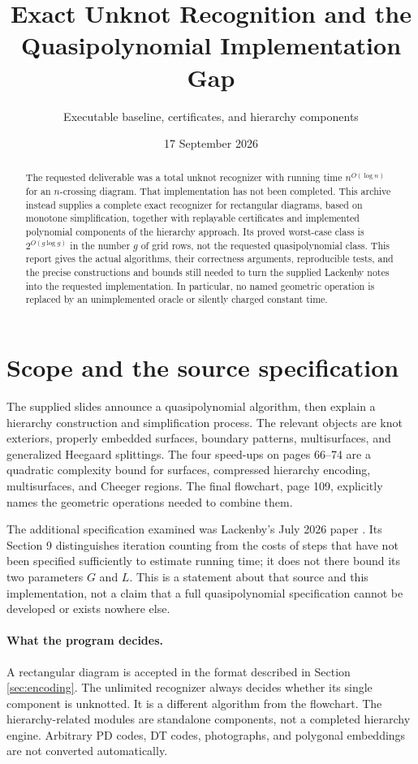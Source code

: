 \documentclass[11pt]{article}
\title{Exact Unknot Recognition and the\\Quasipolynomial Implementation Gap}
\author{Executable baseline, certificates, and hierarchy components}
\date{17 September 2026}
\begin{document}
\maketitle
\begin{abstract}
The requested deliverable was a total unknot recognizer with running time
$n^{O(\log n)}$ for an $n$-crossing diagram. That implementation has not been
completed. This archive instead supplies a complete exact recognizer for
rectangular diagrams, based on monotone simplification, together with replayable
certificates and implemented polynomial components of the hierarchy approach.
Its proved worst-case class is $2^{O(g\log g)}$ in the number $g$ of grid rows,
not the requested quasipolynomial class. This report gives the actual algorithms,
their correctness arguments, reproducible tests, and the precise constructions
and bounds still needed to turn the supplied Lackenby notes into the requested
implementation. In particular, no named geometric operation is replaced by an
unimplemented oracle or silently charged constant time.
\end{abstract}

\section{Scope and the source specification}
The supplied slides \cite{slides} announce a quasipolynomial algorithm, then
explain a hierarchy construction and simplification process. The relevant objects
are knot exteriors, properly embedded surfaces, boundary patterns, multisurfaces,
and generalized Heegaard splittings. The four speed-ups on pages 66--74 are a
quadratic complexity bound for surfaces, compressed hierarchy encoding,
multisurfaces, and Cheeger regions. The final flowchart, page 109, explicitly
names the geometric operations needed to combine them.

The additional specification examined was Lackenby's July 2026 paper
\cite{lackenby}. Its Section 9 distinguishes iteration counting from the costs of
steps that have not been specified sufficiently to estimate running time; it does
not there bound its two parameters $G$ and $L$. This is a statement about that
source and this implementation, not a claim that a full quasipolynomial
specification cannot be developed or exists nowhere else.

\paragraph{What the program decides.}
A rectangular diagram is accepted in the format described in Section
\ref{sec:encoding}. The unlimited recognizer always decides whether its
single component is unknotted. It is a different algorithm from the flowchart.
The hierarchy-related modules are standalone components, not a completed
hierarchy engine. Arbitrary PD codes, DT codes, photographs, and polygonal
embeddings are not converted automatically.
\end{document}
